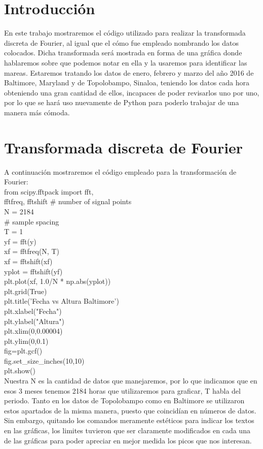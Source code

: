 \documentclass[a4paper,12pt]{article}
\begin{document}
\section{Introducción}
\noindent
En este trabajo mostraremos el código utilizado para realizar la transformada discreta de Fourier, al igual que el cómo fue empleado nombrando los datos colocados. Dicha transformada será mostrada en forma de una gráfica donde hablaremos sobre que podemos notar en ella y la usaremos para identificar las mareas. Estaremos tratando los datos de enero, febrero y marzo del año 2016 de Baltimore, Maryland y de Topolobampo, Sinaloa, teniendo los datos cada hora obteniendo una gran cantidad de ellos, incapaces de poder revisarlos uno por uno, por lo que se hará uso nuevamente de Python para poderlo trabajar de una manera más cómoda.
\section{Transformada discreta de Fourier}
\noindent
A continuación mostraremos el código empleado para la transformación de Fourier:
\\[0.5cm]


from scipy.fftpack import fft,\\ fftfreq, fftshift
\# number of signal points\\
N = 2184\\
\# sample spacing\\
T = 1\\
yf = fft(y)\\
xf = fftfreq(N, T)\\
xf = fftshift(xf)\\
yplot = fftshift(yf)\\
plt.plot(xf, 1.0/N * np.abs(yplot))\\
plt.grid(True)\\
plt.title('Fecha vs Altura Baltimore')\\
plt.xlabel("Fecha")\\
plt.ylabel("Altura")\\
plt.xlim(0,0.00004)\\
plt.ylim(0,0.1)\\
fig=plt.gcf()\\
fig.set\_size\_inches(10,10)\\
plt.show()
\\[0.5cm]

\noindent
Nuestra N es la cantidad de datos que manejaremos, por lo que indicamos que en esos 3 meses tenemos 2184 horas que utilizaremos para graficar, T habla del periodo. Tanto en los datos de Topolobampo como en Baltimore se utilizaron estos apartados de la misma manera, puesto que coincidían en números de datos. Sin embargo, quitando los comandos meramente estéticos para indicar los textos en las gráficas, los limites tuvieron que ser claramente modificados en cada una de las gráficas para poder apreciar en mejor medida los picos que nos interesan.
\end{document}
